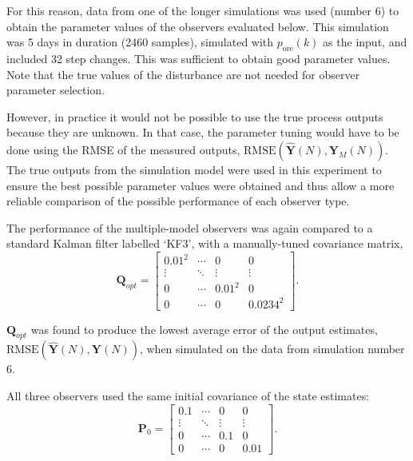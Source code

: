 For this reason, data from one of the longer simulations was used (number 6) to obtain the parameter values of the observers evaluated below. This simulation was 5 days in duration (2460 samples), simulated with $p_\text{ore}(k)$ as the input, and included 32 step changes. This was sufficient to obtain good parameter values. Note that the true values of the disturbance are not needed for observer parameter selection.

However, in practice it would not be possible to use the true process outputs because they are unknown. In that case, the parameter tuning would have to be done using the \gls{RMSE} of the measured outputs, $\text{RMSE}(\hat{\mathbf{Y}}(N), \mathbf{Y}_M(N))$. The true outputs from the simulation model were used in this experiment to ensure the best possible parameter values were obtained and thus allow a more reliable comparison of the possible performance of each observer type.

The performance of the multiple-model observers was again compared to a standard Kalman filter labelled `KF3', with a manually-tuned covariance matrix,
\begin{equation} \label{eq:Q_opt}
	\mathbf{Q}_{opt}=\begin{bmatrix}
		0.01^2 & \cdots & 0 & 0 \\
		\vdots & \ddots & \vdots & \vdots \\
		0 & \cdots & 0.01^2 & 0 \\
		0 & \cdots & 0 & 0.0234^2
	\end{bmatrix}.
\end{equation}

$\mathbf{Q}_{opt}$ was found to produce the lowest average error of the output estimates, $\text{RMSE}(\hat{\mathbf{Y}}(N),\mathbf{Y}(N))$, when simulated on the data from simulation number 6.

All three observers used the same initial covariance of the state estimates:
\begin{equation} \label{eq:P0}
	\mathbf{P}_0=\begin{bmatrix}
		0.1 & \cdots & 0 & 0 \\
		\vdots & \ddots & \vdots & \vdots \\
		0 & \cdots & 0.1 & 0 \\
		0 & \cdots & 0 & 0.01
	\end{bmatrix}.
\end{equation}


